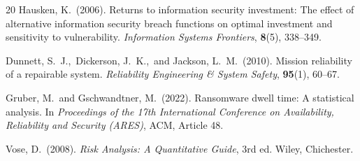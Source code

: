 \documentclass[12pt,a4paper]{article}
\theoremstyle{plain}
\theoremstyle{definition}
\theoremstyle{remark}
\begin{document}
\begin{thebibliography}{20}
Hausken, K.\ (2006).
Returns to information security investment: The effect of alternative information security breach functions on optimal investment and sensitivity to vulnerability.
\textit{Information Systems Frontiers}, \textbf{8}(5), 338--349.

Dunnett, S.\ J.,\ Dickerson, J.\ K.,\ and Jackson, L.\ M.\ (2010).
Mission reliability of a repairable system.
\textit{Reliability Engineering \& System Safety}, \textbf{95}(1), 60--67.

Gruber, M.\ and Gschwandtner, M.\ (2022).
Ransomware dwell time: A statistical analysis.
In \textit{Proceedings of the 17th International Conference on Availability,
Reliability and Security (ARES)}, ACM, Article 48.

Vose, D.\ (2008).
\textit{Risk Analysis: A Quantitative Guide}, 3rd ed.
Wiley, Chichester.

\end{thebibliography}
\end{document}
